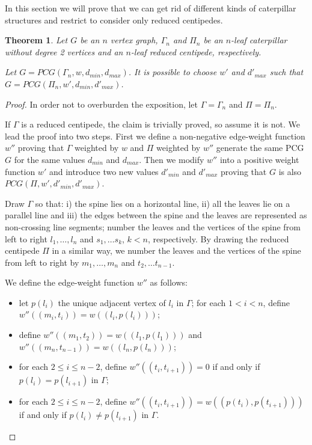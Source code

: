 \documentclass[review]{elsarticle}
\newtheorem{theorem}{Theorem}
\begin{document}
In this section we will prove that we can get rid of different kinds of caterpillar structures and restrict to consider only reduced centipedes. 

\begin{theorem}
\label{th.caterpillar}
Let $G$ be an $n$ vertex graph, $\Gamma_n$ and $\Pi_n$ be an $n$-leaf caterpillar without degree 2 vertices and an $n$-leaf reduced centipede, respectively.

Let $G=PCG(\Gamma_n,w,d_{min}, d_{max})$.
It is possible to choose $w'$ and  $d'_{max}$ such that $G=PCG(\Pi_n,w',d_{min}, d'_{max})$. 
\end{theorem}

\begin{proof}
In order not to overburden the exposition, let $\Gamma = \Gamma_n$ and $\Pi = \Pi_n$.

If $\Gamma$ is a reduced centipede, the claim is trivially proved, so assume it is not.
We lead the proof into two steps. 
First we define a non-negative edge-weight function $w''$ proving that $\Gamma$ weighted by $w$ and $\Pi$ weighted by $w''$ generate the same PCG $G$ for the same values $d_{min}$ and  $d_{max}$.
Then we modify $w''$ into a positive weight function $w'$ and introduce two new values $d'_{min}$ and $d'_{max}$ proving that $G$ is also $PCG(\Pi,w',d'_{min}, d'_{max})$.

Draw $\Gamma$ so that: i) the spine lies on a horizontal line, ii) all the leaves lie on a parallel line and iii) the edges between the spine and the leaves are represented as non-crossing line segments; number the leaves and the vertices of the spine from left to right $l_1, \ldots , l_n$ and $s_1, \ldots s_k$, $k <n$, respectively.
By drawing the reduced centipede $\Pi$ in a similar way, we number the leaves and the vertices of the spine from left to right by $m_1, \ldots , m_n$ and $t_2, \ldots t_{n-1}$.

We define the edge-weight function $w''$ as follows:

\begin{itemize}
\item
let $p(l_i)$ the unique adjacent vertex of $l_i$ in $\Gamma$; for each $1 < i < n$, define $w''((m_i, t_i))=w((l_i, p(l_i)))$;
\item
define $w''((m_1, t_2))=w((l_1, p(l_1)))$ and $w''((m_n, t_{n-1}))=w((l_n, p(l_n)))$;
\item
for each $2\leq i \leq n-2$, define $w''((t_i, t_{i+1}))=0$ if and only if $p(l_i)=p(l_{i+1})$ in $\Gamma$;
\item
for each $2\leq i \leq n-2$, define $w''((t_i, t_{i+1}))=w((p(t_i), p(t_{i+1})))$ if and only if $p(l_i) \neq p(l_{i+1})$ in $\Gamma$.
\end{itemize}


\end{proof}
\end{document}
